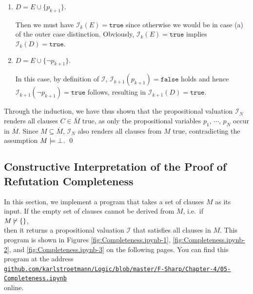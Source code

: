 \begin{enumerate}
\begin{enumerate}
\begin{enumerate}[1.]
          In this case, $\mathcal{I}_{k+1}(D) = \mathtt{true}$ already holds by the induction hypothesis.        
    \item $D = E \cup \{ p_{k+1} \}$.

          Then we must have $\mathcal{I}_k(E) = \mathtt{true}$ since otherwise we would be in case (a) of the
          outer case distinction.  Obviously, $\mathcal{I}_k(E) = \mathtt{true}$ implies $\mathcal{I}_k(D) = \mathtt{true}$.
    \item $D = E \cup \{ \neg p_{k+1} \}$.

          In this case, by definition of $\mathcal{I}$, $\mathcal{I}_{k+1}(p_{k+1}) = \mathtt{false}$
          holds and hence $\mathcal{I}_{k+1}(\neg p_{k+1}) = \mathtt{true}$ follows, resulting in
          $\mathcal{I}_{k+1}(D) = \mathtt{true}$.
    \end{enumerate}
    
    Through the induction, we have thus shown that the propositional valuation
    $\mathcal{I}_{N}$ renders all clauses $C \in \overline{M}$ true, as only the
    propositional variables $p_1$, $\cdots$, $p_N$ occur in $\overline{M}$.
    Since $M \subseteq \overline{M}$, $\mathcal{I}_{N}$ also renders all clauses from $M$ true, 
    contradicting the assumption $M \models \bot$. \qed
  \end{enumerate}
\end{enumerate}

\subsection{Constructive Interpretation of the Proof of Refutation Completeness}
In this section, we implement a program that takes a set of clauses $M$ as its input.
If the empty set of clauses cannot be derived from $M$, i.e.~if
\\[0.2cm]
\hspace*{1.3cm}
$M\, {\not}\!\vdash \{\}$,
\\[0.2cm]
then it returns a propositional valuation $\mathcal{I}$ that satisfies all clauses in $M$.
This program is shown in Figures \ref{fig:Completeness.ipynb-1}, \ref{fig:Completeness.ipynb-2}, and \ref{fig:Completeness.ipynb-3} on the following pages. You can find this program at the address
\\[0.2cm]
\hspace*{0.3cm}
\href{https://github.com/karlstroetmann/Logic/blob/master/F-Sharp/Chapter-4/05-Completeness.ipynb}{\texttt{github.com/karlstroetmann/Logic/blob/master/F-Sharp/Chapter-4/05-Completeness.ipynb}}
\\[0.2cm]
online.

